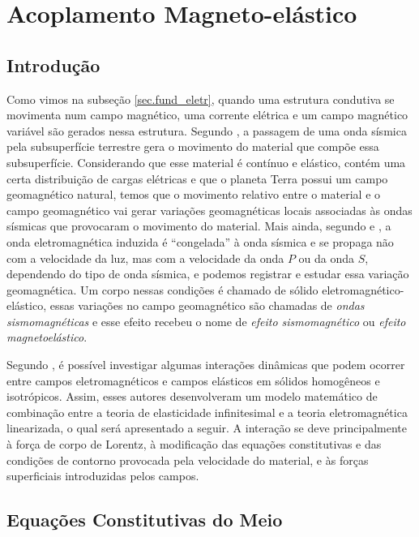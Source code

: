\chapter{Acoplamento Magneto-el\'astico}

\section{Introdu\c{c}\~ao}

Como vimos na subse\c{c}\~ao \ref{sec.fund_eletr}, quando uma estrutura condutiva se movimenta num campo magn\'etico, uma corrente el\'etrica e um campo magn\'etico vari\'avel s\~ao gerados nessa estrutura. Segundo \cite{Mikhailenko_1997}, a passagem de uma onda s\'ismica pela subsuperf\'icie terrestre gera o movimento do material que comp\~oe essa subsuperf\'icie. Considerando que esse material \'e cont\'inuo e el\'astico, cont\'em uma certa distribui\c{c}\~ao de cargas el\'etricas e que o planeta Terra possui um campo geomagn\'etico natural, temos que o movimento relativo entre o material e o campo geomagn\'etico vai gerar varia\c{c}\~oes geomagn\'eticas locais associadas \`as ondas s\'ismicas que provocaram o movimento do material. Mais ainda, segundo \cite{Anisimov_1985} e \cite{Sadovsky_1980}, a onda eletromagn\'etica induzida \'e ``congelada'' \`a onda s\'ismica e se propaga n\~ao com a velocidade da luz, mas com a velocidade da onda $P$ ou da onda $S$, dependendo do tipo de onda s\'ismica, e podemos registrar e estudar essa varia\c{c}\~ao geomagn\'etica.
Um corpo nessas condi\c{c}\~oes \'e chamado de s\'olido eletromagn\'etico-el\'astico, essas varia\c{c}\~oes no campo geomagn\'etico s\~ao chamadas de \textit{ondas sismomagn\'eticas} e esse efeito recebeu o nome de \textit{efeito sismomagn\'etico} ou \textit{efeito magnetoel\'astico}.

Segundo \cite{erigen_1963}, \'e poss\'ivel investigar algumas intera\c{c}\~oes din\^amicas que podem ocorrer entre campos eletromagn\'eticos e campos el\'asticos em s\'olidos homog\^eneos e isotr\'opicos. Assim, esses autores desenvolveram um modelo matem\'atico de combina\c{c}\~ao entre a teoria de elasticidade infinitesimal e a teoria eletromagn\'etica linearizada, o qual ser\'a apresentado a seguir. A intera\c{c}\~ao se deve principalmente \`a for\c{c}a de corpo de Lorentz, \`a modifica\c{c}\~ao das equa\c{c}\~oes constitutivas e das condi\c{c}\~oes de contorno provocada pela velocidade do material, e \`as for\c{c}as superficiais introduzidas pelos campos.


\section{Equa\c{c}\~oes Constitutivas do Meio}

